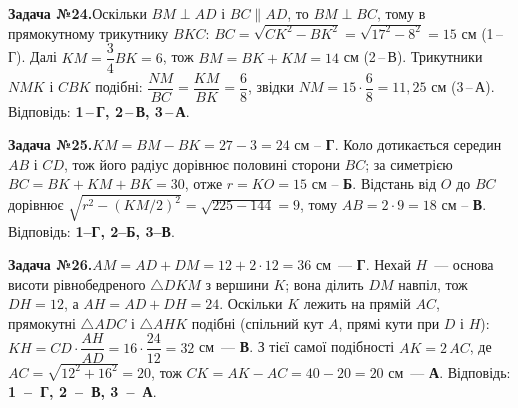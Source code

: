 \documentclass[12pt]{article}
\begin{document}
\par\vspace{0.3cm}\noindent\hypertarget{sol:24}{}
\begin{tcolorbox}[colback=titleBg!40, colframe=mainGreen!55, boxrule=0.4pt, arc=2pt, left=6pt, right=6pt, top=4pt, bottom=4pt, breakable]
\noindent\small\textbf{Задача №24.}\quad Оскільки $BM\perp AD$ і $BC\parallel AD$, то $BM\perp BC$, тому в прямокутному трикутнику $BKC$: $BC=\sqrt{CK^2-BK^2}=\sqrt{17^2-8^2}=15$ см (1\,--\,Г). Далі $KM=\dfrac{3}{4}BK=6$, тож $BM=BK+KM=14$ см (2\,--\,В). Трикутники $NMK$ і $CBK$ подібні: $\dfrac{NM}{BC}=\dfrac{KM}{BK}=\dfrac{6}{8}$, звідки $NM=15\cdot\dfrac{6}{8}=11{,}25$ см (3\,--\,А). Відповідь: \textbf{1\,--\,Г, 2\,--\,В, 3\,--\,А}.
\par\vspace{0.1cm}\hfill\hyperlink{task:24}{}
\end{tcolorbox}
\par\vspace{0.3cm}\noindent\hypertarget{sol:25}{}
\begin{tcolorbox}[colback=titleBg!40, colframe=mainGreen!55, boxrule=0.4pt, arc=2pt, left=6pt, right=6pt, top=4pt, bottom=4pt, breakable]
\noindent\small\textbf{Задача №25.}\quad $KM=BM-BK=27-3=24$ см -- \textbf{Г}. Коло дотикається середин $AB$ і $CD$, тож його радіус дорівнює половині сторони $BC$; за симетрією $BC=BK+KM+BK=30$, отже $r=KO=15$ см -- \textbf{Б}. Відстань від $O$ до $BC$ дорівнює $\sqrt{r^2-(KM/2)^2}=\sqrt{225-144}=9$, тому $AB=2\cdot9=18$ см -- \textbf{В}. Відповідь: \textbf{1--Г, 2--Б, 3--В}.
\par\vspace{0.1cm}\hfill\hyperlink{task:25}{}
\end{tcolorbox}
\par\vspace{0.3cm}\noindent\hypertarget{sol:26}{}
\begin{tcolorbox}[colback=titleBg!40, colframe=mainGreen!55, boxrule=0.4pt, arc=2pt, left=6pt, right=6pt, top=4pt, bottom=4pt, breakable]
\noindent\small\textbf{Задача №26.}\quad $AM=AD+DM=12+2\cdot12=36$ см~--- \textbf{Г}. Нехай $H$~--- основа висоти рівнобедреного $\triangle DKM$ з вершини $K$; вона ділить $DM$ навпіл, тож $DH=12$, а $AH=AD+DH=24$. Оскільки $K$ лежить на прямій $AC$, прямокутні $\triangle ADC$ і $\triangle AHK$ подібні (спільний кут $A$, прямі кути при $D$ і $H$): $KH=CD\cdot\dfrac{AH}{AD}=16\cdot\dfrac{24}{12}=32$ см~--- \textbf{В}. З тієї самої подібності $AK=2\,AC$, де $AC=\sqrt{12^2+16^2}=20$, тож $CK=AK-AC=40-20=20$ см~--- \textbf{А}. Відповідь: \textbf{1~--~Г, 2~--~В, 3~--~А}.
\par\vspace{0.1cm}\hfill\hyperlink{task:26}{}
\end{tcolorbox}
\end{document}
